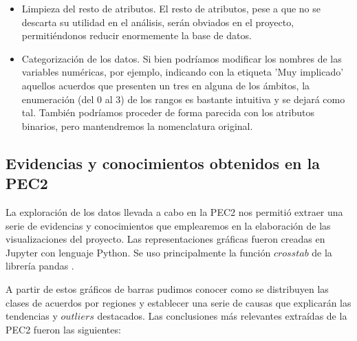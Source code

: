 \documentclass[11pt]{article}
\begin{document}
\begin{itemize}
    \item Limpieza del resto de atributos. El resto de atributos, pese a que no se descarta su utilidad en el análisis, serán obviados en el proyecto, permitiéndonos reducir enormemente la base de datos.
    
    \item Categorización de los datos. Si bien podríamos modificar los nombres de las variables numéricas, por ejemplo, indicando con la etiqueta 'Muy implicado' aquellos acuerdos que presenten un tres en alguna de los ámbitos, la enumeración (del 0 al 3) de los rangos es bastante intuitiva y se dejará como tal. También podríamos proceder de forma parecida con los atributos binarios, pero mantendremos la nomenclatura original.
\end{itemize}

\subsection{Evidencias y conocimientos obtenidos en la PEC2} \label{ev}

La exploración de los datos llevada a cabo en la PEC2 nos permitió extraer una serie de evidencias y conocimientos que emplearemos en la elaboración de las visualizaciones del proyecto. Las representaciones gráficas fueron creadas en Jupyter con lenguaje Python. Se uso principalmente la función $\textit{crosstab}$ de la librería pandas \cite{pandas}.

A partir de estos gráficos de barras pudimos conocer como se distribuyen las clases de acuerdos por regiones y establecer una serie de causas que explicarán las tendencias y $\textit{outliers}$ destacados. Las conclusiones más relevantes extraídas de la PEC2 fueron las siguientes:
\end{document}
